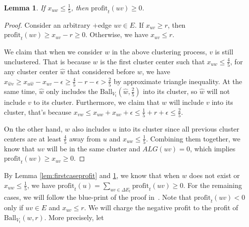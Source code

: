 \documentclass[11pt]{article}
\newtheorem{lemma}[theorem]{Lemma}
\newcommand{\ball}{\mathrm{Ball}}
\newcommand{\profit}{\mathrm{profit}}
\newcommand{\onefive}{\frac{1}{5}}
\newcommand{\twofive}{\frac{2}{5}}
\newcommand{\fourfive}{\frac{4}{5}}
\begin{document}
\begin{CJK*}{UTF8}{gbsn}
\begin{lemma}
\label{lem:secondcaseprofit}
If $x_{uw} \leq \onefive$, then $\profit_t(uv) \geq 0$.
\end{lemma}
\begin{proof}
Consider an arbitrary $+$edge $uv \in E$. If $x_{uv} \geq r$, then $\profit_t(uv) \geq x_{uv} - r \geq 0$. Otherwise, we have $x_{uv} \leq r$. 

We claim that when we consider $w$ in the above clustering process, $v$ is still unclustered. That is because $w$ is the first cluster center such that $x_{uw} \leq \fourfive$, for any cluster center $\hat{w}$ that considered before $w$, we have $x_{\hat{w}v} \geq x_{u\hat{w}} - x_{uv} - \epsilon \geq \fourfive - r - \epsilon > \twofive$ by approximate triangle inequality. At the same time,  $\hat{w}$ only includes the $\ball_{V_t}(\hat{w}, \twofive)$ into its cluster, so $\hat{w}$ will not include $v$ to its cluster. Furthermore, we claim that $w$ will include $v$ into its cluster, that's because $x_{vw} \leq x_{uw} + x_{uv} + \epsilon \leq \onefive + r + \epsilon \leq \twofive$.

On the other hand, $w$ also includes $u$ into its cluster since all previous cluster centers are at least $\fourfive$ away from $u$ and $x_{uw} \leq \onefive$. Combining them together, we know that $uv$ will be in the same cluster and $ALG(uv) = 0$, which implies $\profit_t(uv) \geq x_{uv} \geq 0$.
\end{proof}

By Lemma \ref{lem:firstcaseprofit} and \ref{lem:secondcaseprofit}, we know that when $w$ does not exist or $x_{uw} \leq \onefive$, we have $\profit_t(u) = \sum_{uv \in \Delta E_t} \profit_t(uv) \geq 0$.  For the remaining cases, we will follow the blue-print of the proof in~\cite{kalhan2019correlation}. Note that $\profit_{t}(uv) < 0$ only if $uv \in E$ and $x_{uv} \leq r$. We will charge the negative profit to the profit of $\ball_{V_t}(w,r)$. More precisely, let 


\end{CJK*}
\end{document}
